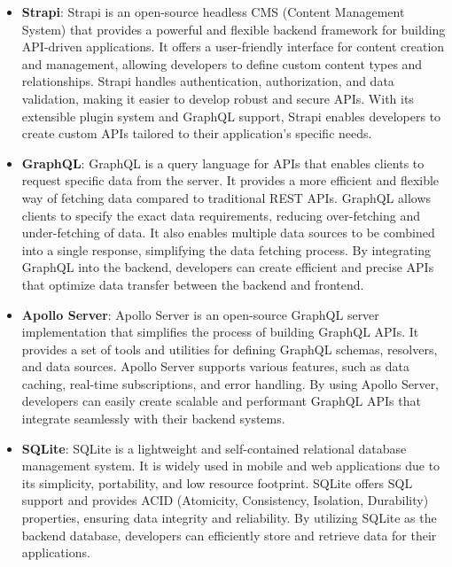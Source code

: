 \begin{itemize}
  \item \textbf{Strapi}: Strapi is an open-source headless CMS (Content Management System) that provides a powerful and flexible backend framework for building API-driven applications. It offers a user-friendly interface for content creation and management, allowing developers to define custom content types and relationships. Strapi handles authentication, authorization, and data validation, making it easier to develop robust and secure APIs. With its extensible plugin system and GraphQL support, Strapi enables developers to create custom APIs tailored to their application's specific needs. \cite{strapi}

  \item \textbf{GraphQL}: GraphQL is a query language for APIs that enables clients to request specific data from the server. It provides a more efficient and flexible way of fetching data compared to traditional REST APIs. GraphQL allows clients to specify the exact data requirements, reducing over-fetching and under-fetching of data. It also enables multiple data sources to be combined into a single response, simplifying the data fetching process. By integrating GraphQL into the backend, developers can create efficient and precise APIs that optimize data transfer between the backend and frontend. \cite{graphql}

  \item \textbf{Apollo Server}: Apollo Server is an open-source GraphQL server implementation that simplifies the process of building GraphQL APIs. It provides a set of tools and utilities for defining GraphQL schemas, resolvers, and data sources. Apollo Server supports various features, such as data caching, real-time subscriptions, and error handling. By using Apollo Server, developers can easily create scalable and performant GraphQL APIs that integrate seamlessly with their backend systems. \cite{apolloserver}

  \item \textbf{SQLite}: SQLite is a lightweight and self-contained relational database management system. It is widely used in mobile and web applications due to its simplicity, portability, and low resource footprint. SQLite offers SQL support and provides ACID (Atomicity, Consistency, Isolation, Durability) properties, ensuring data integrity and reliability. By utilizing SQLite as the backend database, developers can efficiently store and retrieve data for their applications. \cite{sqlite}
\end{itemize}


